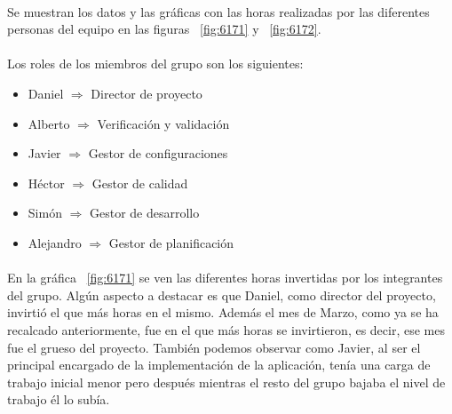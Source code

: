 
\paragraph{} Se muestran los datos y las gráficas con las horas realizadas por las diferentes personas del equipo en las figuras ~\cref{fig:6171} y ~\cref{fig:6172}. 

\paragraph{} Los roles de los miembros del grupo son los siguientes:
\begin{itemize}
\item Daniel $\Rightarrow$ Director de proyecto
\item Alberto $\Rightarrow$ Verificación y validación
\item Javier $\Rightarrow$ Gestor de configuraciones
\item Héctor $\Rightarrow$ Gestor de calidad
\item Simón $\Rightarrow$ Gestor de desarrollo
\item Alejandro $\Rightarrow$ Gestor de planificación
\end{itemize}

\paragraph{} En la gráfica ~\cref{fig:6171} se ven las diferentes horas invertidas por los integrantes del grupo. Algún aspecto a destacar es que Daniel, como director del proyecto, invirtió el que más horas en el mismo. Además el mes de Marzo, como ya se ha recalcado anteriormente, fue en el que más horas se invirtieron, es decir, ese mes fue el grueso del proyecto. También podemos observar como Javier, al ser el principal encargado de la implementación de la aplicación, tenía una carga de trabajo inicial menor pero después mientras el resto del grupo bajaba el nivel de trabajo él lo subía.

